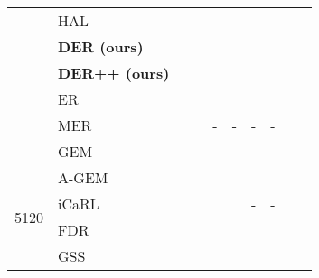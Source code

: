 \documentclass{article}
\begin{document}
\begin{table}[H]
{{\begin{tabular}{clcccccccc}
                        & HAL                   &  \tiny{}                              &   \tiny{}                         & \tiny{}                       &  \tiny{}                         & \tiny{}                      & \tiny{} \\
                        & \textbf{DER (ours)}   &    \tiny{}                            &   \tiny{}                         & \tiny{}                       &  \tiny{}                         &  \tiny{}                      &  \tiny{} \\
                        & \textbf{DER++ (ours)} &    \tiny{}  &   \tiny{}                         & \tiny{}&  \tiny{}                      &  \tiny{}&  \tiny{} \\
\midrule                                                                                    
                        & ER                    &    \tiny{}                            &    \tiny{}                         & \tiny{}                       &  \tiny{}&  \tiny{}                      &  \tiny{} \\
                        & MER                   &    \tiny{}  &    \tiny{}                         & -                                              & -                                                & -                                             & -                       \\
                        & GEM                   &    \tiny{}                            &    \tiny{}                         & \tiny{}                       & \tiny{}                          &  \tiny{}                      &  \tiny{} \\
                        & A-GEM                 &  \tiny{}                            &   \tiny{}& \tiny{}                       & \tiny{}                          & \tiny{}                      & \tiny{} \\              
\multirow{2}{*}{5120}   & iCaRL                 &   \tiny{}                            &   \tiny{}                         & \tiny{}                       & \tiny{}                          & -                                             & -                        \\
                        & FDR                   &   \tiny{}                            &   \tiny{}                         & \tiny{}                       & \tiny{}                          &  \tiny{}                      &  \tiny{} \\
                        & GSS                   &    \tiny{}                            &   \tiny{}                         & \tiny{}                       & \tiny{}                          & \tiny{}                      & \tiny{} \\

\end{tabular}}}
\end{table}
\end{document}
